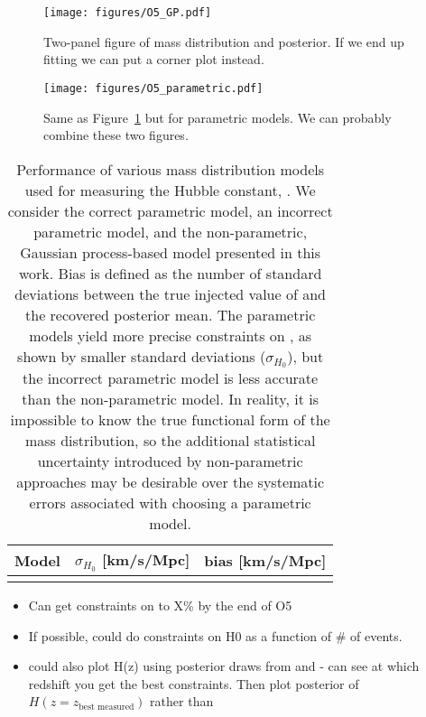 \documentclass[]{aastex631}
\begin{document}
\begin{figure}
    \centering
    \texttt{[image: figures/O5\_GP.pdf]}
    \caption{Two-panel figure of mass distribution and \Ho{} posterior. If we end up fitting \Omm{} we can put a corner plot instead.}
    \label{fig:O5_GP}
\end{figure}

\begin{figure}
    \centering
    \texttt{[image: figures/O5\_parametric.pdf]}
    \caption{Same as Figure~\ref{fig:O5_GP} but for parametric models. We can probably combine these two figures.}
    \label{fig:O5_parametric}
\end{figure}

\begin{table}[]
    \centering
    \begin{tabular}{c|c c}
         Model & $\sigma_{H_0}$ [km/s/Mpc] & bias [km/s/Mpc]\\
         \hline
         & 
    \end{tabular}
    \caption{Performance of various mass distribution models used for measuring the Hubble constant, \Ho.
    We consider the correct parametric model, an incorrect parametric model, and the non-parametric, Gaussian process-based model presented in this work.
    Bias is defined as the number of standard deviations between the true injected value of \Ho and the recovered posterior mean. 
    The parametric models yield more precise constraints on \Ho{}, as shown by smaller standard deviations ($\sigma_{H_0}$), but the incorrect parametric model is less accurate than the non-parametric model.
    In reality, it is impossible to know the true functional form of the mass distribution, so the additional statistical uncertainty introduced by non-parametric approaches may be desirable over the systematic errors associated with choosing a parametric model.
    }
    \label{tab:bias}
\end{table}

\begin{itemize}
    \item Can get constraints on \Ho{} to X\% by the end of O5
    \item If possible, could do constraints on H0 as a function of \# of events.
    \item could also plot H(z) using posterior draws from \Ho{} and \Omm{}- can see at which redshift you get the best constraints. Then plot posterior of $H(z=z_{\text{best measured}})$ rather than \Ho
\end{itemize}
\end{document}
